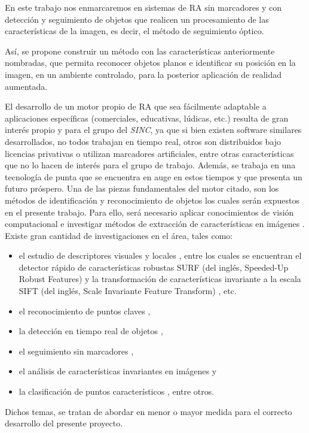 En este trabajo nos enmarcaremos en sistemas de RA sin marcadores y con detección y seguimiento de objetos que realicen un procesamiento de las características de la imagen, es decir, el método de seguimiento óptico.

Así, se propone construir un método con las características anteriormente nombradas, que permita reconocer objetos planos e identificar su posición en la imagen, en un ambiente controlado, para la posterior aplicación de realidad aumentada. 

El desarrollo de un motor propio de RA que sea fácilmente adaptable a aplicaciones específicas (comerciales, educativas, lúdicas, etc.) resulta de gran interés propio y para el grupo del \textit{SINC}, ya que si bien existen software similares desarrollados, no todos trabajan en tiempo real, otros son distribuidos bajo licencias privativas o utilizan marcadores artificiales, entre otras características que no lo hacen de interés para el grupo de trabajo. Además, se trabaja en una tecnología de punta que se encuentra en auge en estos tiempos y que presenta un futuro próspero. Una de las piezas fundamentales del motor citado, son los métodos de identificación y reconocimiento de objetos los cuales serán expuestos en el presente trabajo. Para ello, será necesario aplicar conocimientos de visión computacional \cite{citeulike:3484001, citeulike:9456628, bb1919} e investigar métodos de extracción de características en imágenes \cite{Nixon:2002:FEI}. Existe gran cantidad de investigaciones en el área, tales como:
\begin{itemize}
 \item el estudio de descriptores visuales \cite{BouGar} y locales \cite{bb53077, TuytelaarsM07, BenhimaneNGGNM08}, entre los cuales se encuentran el detector rápido de características robustas SURF (del inglés, Speeded-Up Robust Features) \cite{Bay:2008:SRF} y la transformación de características invariante a la escala SIFT (del inglés, Scale Invariante Feature Transform) \cite{bb48614}, etc.
 \item el reconocimiento de puntos claves \cite{bb36798},
 \item la detección en tiempo real de objetos \cite{conf/cvpr/HinterstoisserLIFN10},
 \item el seguimiento sin marcadores \cite{5607509},
 \item el análisis de características invariantes en imágenes \cite{conf/ismar/2004, Lowe:2004:DIF:993451.996342} y
 \item la clasificación de puntos característicos \cite{oai:infoscience.epfl.ch:52666}, entre otros.
\end{itemize}
Dichos temas, se tratan de abordar en menor o mayor medida para el correcto desarrollo del presente proyecto.
